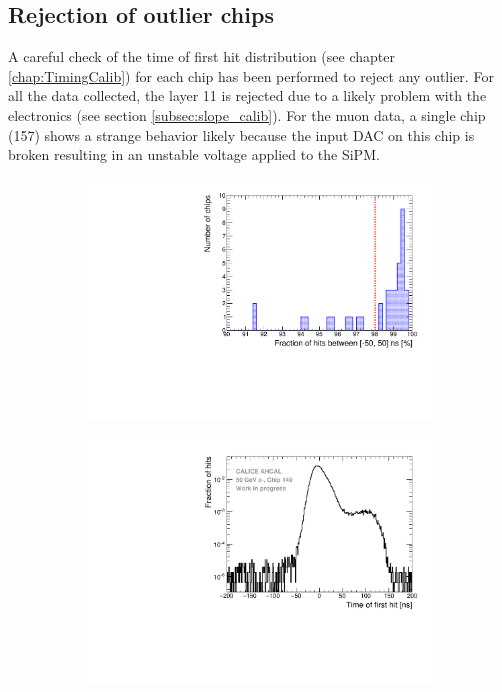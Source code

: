 \subsection{Rejection of outlier chips}
\label{sec:ChipRejection}

A careful check of the time of first hit distribution (see chapter \ref{chap:TimingCalib}) for each chip has been performed to reject any outlier. For all the data collected, the layer 11 is rejected due to a likely problem with the electronics (see section \ref{subsec:slope_calib}). For the muon data, a single chip (157) shows a strange behavior likely because the input DAC on this chip is broken resulting in an unstable voltage applied to the SiPM.

\begin{figure}[htbp!]
	\begin{subfigure}[t]{0.5\textwidth}
		\centering
		\includegraphics[width=1\linewidth]{../Thesis_Plots/Timing/Electrons/Plots/FractionRejectedChips.pdf}
		\caption{} \label{fig:FracRejChip}
	\end{subfigure}
	\hfill
	\begin{subfigure}[t]{0.5\textwidth}
		\centering
		\includegraphics[width=1\linewidth]{../Thesis_Plots/Timing/Electrons/Plots/ExampleBadChip149.pdf}

\end{subfigure}
\end{figure}
